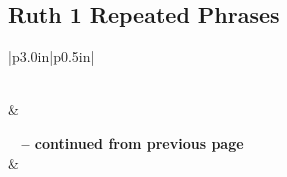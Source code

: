 \subsection{Ruth 1 Repeated Phrases}


\normalsize
 
\begin{center}
\begin{longtable}{|p{3.0in}|p{0.5in}|}
\caption[Ruth 1 Repeated Phrases]{Ruth 1 Repeated Phrases}\label{table:Repeated Phrases Ruth 1} \\
\hline {} &  \\ \hline 
\endfirsthead
 
{{\bfseries \tablename\ \thetable{} -- continued from previous page}} \\  
\hline {} &  \\ \hline 
\endhead
 

\end{longtable}
\end{center}
